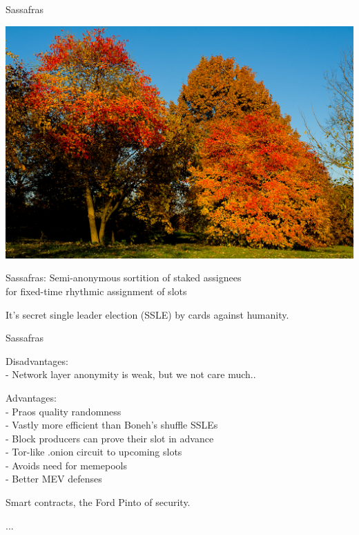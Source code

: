 \documentclass{beamer}
\begin{document}
\begin{frame}{Sassafras}

\includegraphics[width=\textwidth]{Sassafras-albidum.jpg}

\end{frame}



\begin{frame}

Sassafras: Semi-anonymous sortition of staked assignees \\
\hspace{5pt} for fixed-time rhythmic assignment of slots

\bigskip\bigskip

It's secret single leader election (SSLE) by cards against humanity.

\end{frame}



\begin{frame}{Sassafras}

Disadvantages: \\
- Network layer anonymity is weak, but we not care much.. \\

\bigskip\bigskip

Advantages: \\ \smallskip
- Praos quality randomness \\ \smallskip
- Vastly more efficient than Boneh's shuffle SSLEs \\ \smallskip
- Block producers can prove their slot in advance \\ \smallskip
- Tor-like {.onion} circuit to upcoming slots \\ \smallskip
- Avoids need for memepools \\ \smallskip
- Better MEV defenses \\ \smallskip

\pause\bigskip\bigskip

\hspace{10pt} Smart contracts, the Ford Pinto of security.

\end{frame}



\begin{frame}
	
...	
	
\end{frame}
\end{document}

